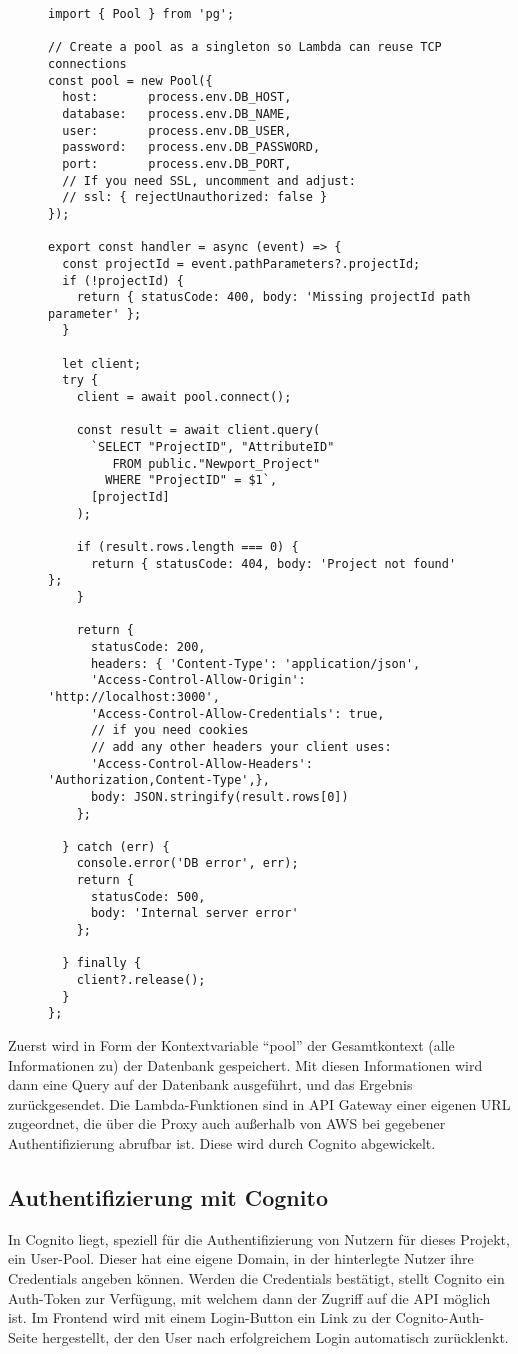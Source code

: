 \begin{figure}[bht]
    \begin{lstlisting}[caption=Lambda-Funktion für die API, label=list:lambdaapi]
		import { Pool } from 'pg';

// Create a pool as a singleton so Lambda can reuse TCP connections
const pool = new Pool({
  host:       process.env.DB_HOST,
  database:   process.env.DB_NAME,
  user:       process.env.DB_USER,
  password:   process.env.DB_PASSWORD,
  port:       process.env.DB_PORT,
  // If you need SSL, uncomment and adjust:
  // ssl: { rejectUnauthorized: false }
});

export const handler = async (event) => {
  const projectId = event.pathParameters?.projectId;
  if (!projectId) {
    return { statusCode: 400, body: 'Missing projectId path parameter' };
  }

  let client;
  try {
    client = await pool.connect();

    const result = await client.query(
      `SELECT "ProjectID", "AttributeID" 
         FROM public."Newport_Project" 
        WHERE "ProjectID" = $1`,
      [projectId]
    );

    if (result.rows.length === 0) {
      return { statusCode: 404, body: 'Project not found' };
    }

    return {
      statusCode: 200,
      headers: { 'Content-Type': 'application/json',
      'Access-Control-Allow-Origin': 'http://localhost:3000',
      'Access-Control-Allow-Credentials': true,         
      // if you need cookies
      // add any other headers your client uses:
      'Access-Control-Allow-Headers': 'Authorization,Content-Type',},
      body: JSON.stringify(result.rows[0])
    };

  } catch (err) {
    console.error('DB error', err);
    return {
      statusCode: 500,
      body: 'Internal server error'
    };

  } finally {
    client?.release();
  }
};

	\end{lstlisting}
\end{figure}
Zuerst wird in Form der Kontextvariable \enquote{pool} der Gesamtkontext (alle Informationen zu) der Datenbank gespeichert. Mit diesen Informationen 
wird dann eine Query auf der Datenbank ausgeführt, und das Ergebnis zurückgesendet. Die Lambda-Funktionen sind in API Gateway einer eigenen URL zugeordnet,
die über die Proxy auch außerhalb von AWS bei gegebener Authentifizierung abrufbar ist. Diese wird durch Cognito abgewickelt.
\subsection{Authentifizierung mit Cognito}
In Cognito liegt, speziell für die Authentifizierung von Nutzern für dieses Projekt, ein User-Pool. Dieser hat eine eigene Domain, in der hinterlegte Nutzer 
ihre Credentials angeben können. Werden die Credentials bestätigt, stellt Cognito ein Auth-Token zur Verfügung, mit welchem dann der Zugriff auf die API möglich ist.
Im Frontend wird mit einem Login-Button ein Link zu der Cognito-Auth-Seite hergestellt, der den User nach erfolgreichem Login automatisch zurücklenkt. 
